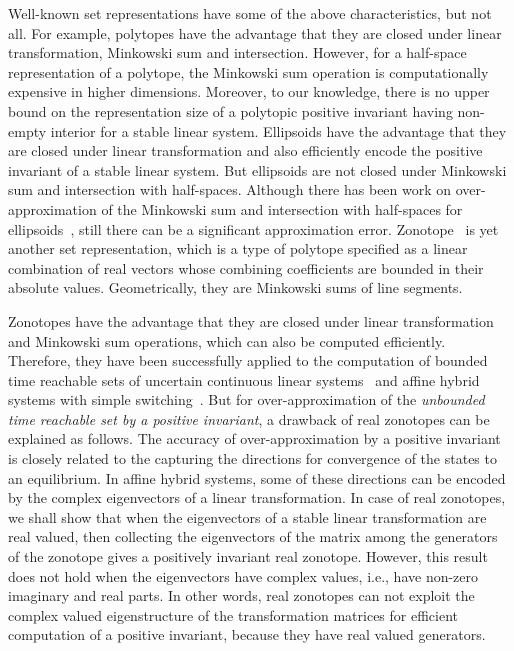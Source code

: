 Well-known set representations have some of the above characteristics,
but not all.  For example, polytopes have the advantage that they are
closed under linear transformation, Minkowski sum and intersection.
However, for a half-space representation of a polytope, the Minkowski
sum operation is computationally expensive in higher dimensions.
Moreover, to our knowledge, there is no upper bound on the
representation size of a polytopic positive invariant having non-empty
interior for a stable linear system.  Ellipsoids have the advantage
that they are closed under linear transformation and also efficiently
encode the positive invariant of a stable linear system.  But
ellipsoids are not closed under Minkowski sum and intersection with
half-spaces.  Although there has been work on over-approximation of
the Minkowski sum and intersection with half-spaces for
ellipsoids~\cite{allamigeon2017fast,kurzhanskiy2006ellipsoidal}, still
there can be a significant approximation
error. Zonotope~\cite{DBLP:conf/hybrid/Girard05} is yet another set
representation, which is a type of polytope specified as a linear
combination of real vectors whose combining coefficients are bounded
in their absolute values.  Geometrically, they are Minkowski sums of
line segments.

Zonotopes have the advantage that they are closed under linear
transformation and Minkowski sum operations, which can also be
computed efficiently.  Therefore, they have been successfully applied
to the computation of bounded time reachable sets of uncertain
continuous linear systems~\cite{DBLP:conf/hybrid/Girard05} and affine
hybrid systems with simple
switching~\cite{makhlouf2014networked,girard2008zonotope}.  But for
over-approximation of the {\it unbounded time reachable set by a
positive invariant}, a drawback of real zonotopes can be explained as follows.  
The accuracy of over-approximation by a positive invariant
is closely related to the capturing the directions for convergence of
the states to an equilibrium.  In affine hybrid systems, some of these
directions can be encoded by the complex eigenvectors of a linear
transformation.  In case of real zonotopes, we shall show that when
the eigenvectors of a stable linear transformation are real valued,
then collecting the eigenvectors of the matrix among the generators of
the zonotope gives a positively invariant real zonotope.  However,
this result does not hold when the eigenvectors have complex values,
i.e., have non-zero imaginary and real parts.  In other words, real
zonotopes can not exploit the complex valued eigenstructure of the
transformation matrices for efficient computation of a positive
invariant, because they have real valued generators.

